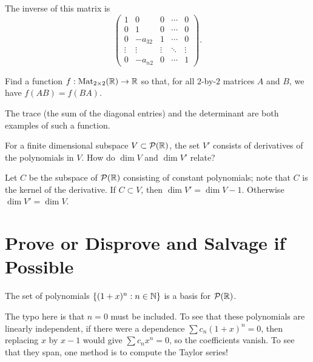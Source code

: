 \documentclass{homework}
\begin{document}
\begin{solution}
  The inverse of this matrix is
    \[\begin{pmatrix}
      1&0&0&\cdots &0\\
      0&1&0&\cdots &0\\
      0&-a_{32}&1&\cdots &0\\
      \vdots &\vdots &\vdots &\ddots &\vdots \\
      0&-a_{n2}&0&\cdots &1
    \end{pmatrix}.\]
\end{solution}

\begin{problem}
  Find a function $f : \operatorname{Mat}_{2\times 2}(\mathbb{R}) \to \mathbb{R}$ so that, for all
  $2$-by-$2$ matrices $A$ and $B$, we have $f(AB) = f(BA)$.
\end{problem}

\begin{solution}
  The trace (the sum of the diagonal entries) and the determinant are
  both examples of such a function.
\end{solution}

\begin{problem}
  For a finite dimensional subspace $V \subset \mathcal{P}(\mathbb{R})$, the
  set $V'$ consists of derivatives of the polynomials in $V$.  How do
  $\dim V$ and $\dim V'$ relate?
\end{problem}

\begin{solution}
  Let $C$ be the subspace of $\mathcal{P}(\mathbb{R})$ consisting of constant
  polynomials; note that $C$ is the kernel of the derivative.  If
  $C \subset V$, then $\dim V' = \dim V - 1$.  Otherwise
  $\dim V' = \dim V$.
\end{solution}

\section{Prove or Disprove and Salvage if Possible}

\begin{problem}
  The set of polynomials $\{ (1+x)^n : n \in \mathbb{N} \}$ is a basis for
  $\mathcal{P}(\mathbb{R})$.
\end{problem}

\begin{solution}
  The typo here is that $n = 0$ must be included.  To see that these
  polynomials are linearly independent, if there were a dependence
  $\sum c_n (1+x)^n = 0$, then replacing $x$ by $x-1$ would give
  $\sum c_n x^n = 0$, so the coefficients vanish.  To see that they
  span, one method is to compute the Taylor series!
\end{solution}
\end{document}
